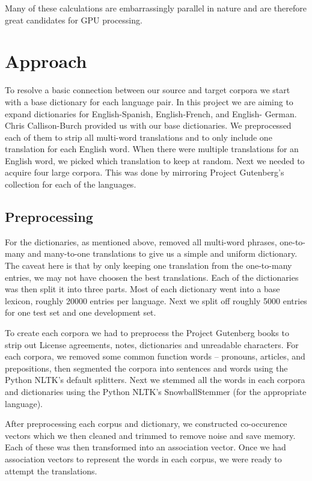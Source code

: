 \documentclass[12pt]{article}
\begin{document}
Many of these calculations are embarrassingly parallel in nature and are therefore great candidates for GPU processing.


\section{Approach}

To resolve a basic connection between our source and target corpora we start with a base dictionary for each language pair. In this project we are aiming to expand dictionaries for English-Spanish, English-French, and English-
German. Chris Callison-Burch provided us with our base dictionaries. We preprocessed each of them to strip all multi-word translations and to only include one translation for each English word. When there were multiple translations for an English word, we picked which translation to keep at random. Next we needed to acquire four large corpora. This was done by mirroring Project Gutenberg's collection for each of the languages.

\subsection{Preprocessing}

For the dictionaries, as mentioned above, removed all multi-word phrases, one-to-many and many-to-one translations to give us a simple and uniform dictionary. The caveat here is that by only keeping one translation from the one-to-many entries, we may not have choosen the best translations. Each of the dictionaries was then split it into three parts. Most of each dictionary went into a base lexicon, roughly 20000 entries per language. Next we split off roughly 5000 entries for one test set and one development set.

To create each corpora we had to preprocess the Project Gutenberg books to strip out License agreements, notes, dictionaries and unreadable characters. For each corpora, we removed some common function words -- pronouns, articles,
and prepositions, then segmented the corpora into sentences and words using the Python NLTK's default splitters. Next we stemmed all the words in each corpora and dictionaries using the Python NLTK's SnowballStemmer (for the appropriate
language).

After preprocessing each corpus and dictionary, we constructed co-occurence vectors which we then cleaned and trimmed to remove noise and save memory. Each of these was then transformed into an association vector. Once we had association vectors to represent the words in each corpus, we were ready to attempt the translations.
\end{document}
